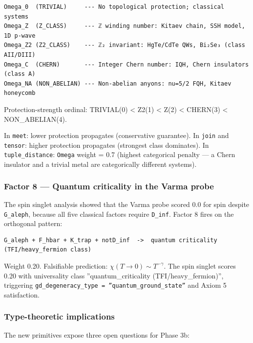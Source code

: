 \documentclass[12pt,a4paper]{article}
\begin{document}
\begin{lstlisting}
Omega_0  (TRIVIAL)     --- No topological protection; classical systems
Omega_Z  (Z_CLASS)     --- ℤ winding number: Kitaev chain, SSH model, 1D p-wave
Omega_Z2 (Z2_CLASS)    --- ℤ₂ invariant: HgTe/CdTe QWs, Bi₂Se₃ (class AII/DIII)
Omega_C  (CHERN)       --- Integer Chern number: IQH, Chern insulators (class A)
Omega_NA (NON_ABELIAN) --- Non-abelian anyons: nu=5/2 FQH, Kitaev honeycomb
\end{lstlisting}

Protection-strength ordinal: TRIVIAL(0) \textless{} Z2(1) \textless{} Z(2) \textless{} CHERN(3) \textless{} NON\_ABELIAN(4).

In \texttt{meet}: lower protection propagates (conservative guarantee).
In \texttt{join} and \texttt{tensor}: higher protection propagates (strongest class dominates).
In \texttt{tuple\_distance}: \texttt{Omega} weight = 0.7 (highest categorical penalty --- a Chern insulator and a trivial metal are categorically different systems).

\subsubsection{Factor 8 --- Quantum criticality in the Varma probe}

The spin singlet analysis showed that the Varma probe scored 0.0 for spin despite \texttt{G\_aleph}, because all five classical factors require \texttt{D\_inf}. Factor 8 fires on the orthogonal pattern:

\begin{lstlisting}
G_aleph + F_hbar + K_trap + notD_inf  ->  quantum criticality (TFI/heavy_fermion class)
\end{lstlisting}

Weight 0.20. Falsifiable prediction: $\chi(T \to 0) \sim T^{-\gamma}$. The spin singlet scores 0.20 with universality class ''quantum\_criticality (TFI/heavy\_fermion)'', triggering \texttt{gd\_degeneracy\_type = ''quantum\_ground\_state''} and Axiom 5 satisfaction.

\subsubsection{Type-theoretic implications}

The new primitives expose three open questions for Phase 3b:
\end{document}
